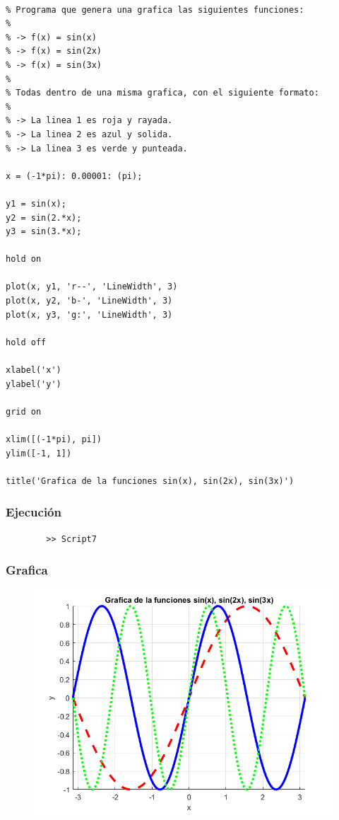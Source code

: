 \documentclass{article}
\begin{document}
	\begin{lstlisting}

% Programa que genera una grafica las siguientes funciones:
%
% -> f(x) = sin(x)
% -> f(x) = sin(2x)
% -> f(x) = sin(3x)
% 
% Todas dentro de una misma grafica, con el siguiente formato:
%
% -> La linea 1 es roja y rayada.
% -> La linea 2 es azul y solida.
% -> La linea 3 es verde y punteada.

x = (-1*pi): 0.00001: (pi);

y1 = sin(x);
y2 = sin(2.*x);
y3 = sin(3.*x);

hold on

plot(x, y1, 'r--', 'LineWidth', 3)
plot(x, y2, 'b-', 'LineWidth', 3)
plot(x, y3, 'g:', 'LineWidth', 3)

hold off

xlabel('x')
ylabel('y')

grid on

xlim([(-1*pi), pi])
ylim([-1, 1])

title('Grafica de la funciones sin(x), sin(2x), sin(3x)')

	\end{lstlisting}
	
	\subsubsection{Ejecución}
	
	\begin{lstlisting}
		>> Script7
	\end{lstlisting}
	
	\newpage
	
	\subsubsection{Grafica}
	
	\begin{figure}[h]
		\centering
		\includegraphics[width=\textwidth]{grafica7.png}
	\end{figure}
	
\end{document}

